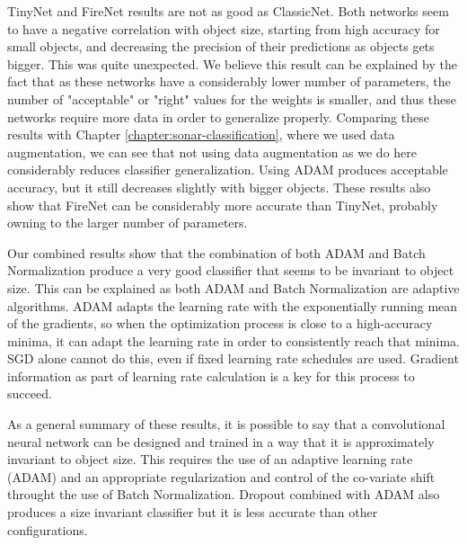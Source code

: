 TinyNet and FireNet results are not as good as ClassicNet. Both networks seem to have a negative correlation with object size, starting from high accuracy for small objects, and decreasing the precision of their predictions as objects gets bigger. This was quite unexpected. We believe this result can be explained by the fact that as these networks have a considerably lower number of parameters, the number of "acceptable" or "right" values for the weights is smaller, and thus these networks require more data in order to generalize properly.
Comparing these results with Chapter \ref{chapter:sonar-classification}, where we used data augmentation, we can see that not using data augmentation as we do here considerably reduces classifier generalization.
Using ADAM produces acceptable accuracy, but it still decreases slightly with bigger objects. These results also show that FireNet can be considerably more accurate than TinyNet, probably owning to the larger number of parameters.

Our combined results show that the combination of both ADAM and Batch Normalization produce a very good classifier that seems to be invariant to object size. This can be explained as both ADAM and Batch Normalization are adaptive algorithms. ADAM adapts the learning rate with the exponentially running mean of the gradients, so when the optimization process is close to a high-accuracy minima, it can adapt the learning rate in order to consistently reach that minima. SGD alone cannot do this, even if fixed learning rate schedules are used. Gradient information as part of learning rate calculation is a key for this process to succeed.

As a general summary of these results, it is possible to say that a convolutional neural network can be designed and trained in a way that it is approximately invariant to object size. This requires the use of an adaptive learning rate (ADAM) and an appropriate regularization and control of the co-variate shift throught the use of Batch Normalization. Dropout combined with ADAM also produces a size invariant classifier but it is less accurate than other configurations.

